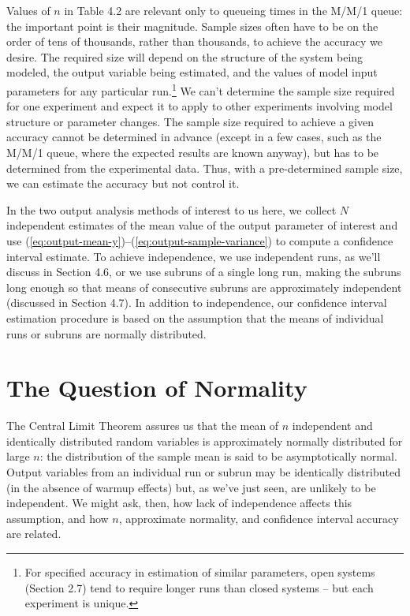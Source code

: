 Values of $n$ in Table 4.2 are relevant only to queueing times in the M/M/1
queue: the important point is their magnitude. Sample sizes often have to be
on the order of tens of thousands, rather than thousands, to achieve the
accuracy we desire. The required size will depend on the structure of the
system being modeled, the output variable being estimated, and the values of
model input parameters for any particular run.\footnote{For specified accuracy
in estimation of similar parameters, open systems (Section 2.7) tend to
require longer runs than closed systems -- but each experiment is unique.} We
can't determine the sample size required for one experiment and expect it to
apply to other experiments involving model structure or parameter changes.
The sample size required to achieve a given accuracy cannot be determined in
advance (except in a few cases, such as the M/M/1 queue, where the expected
results are known anyway), but has to be determined from the experimental
data. Thus, with a pre-determined sample size, we can estimate the accuracy
but not control it.

In the two output analysis methods of interest to us here, we collect $N$
independent estimates of the mean value of the output parameter of interest
and use (\ref{eq:output-mean-y})--(\ref{eq:output-sample-variance}) to compute
a confidence interval estimate. To achieve independence, we use independent
runs, as we'll discuss in Section 4.6, or we use subruns of a single long run,
making the subruns long enough so that means of consecutive subruns are
approximately independent (discussed in Section 4.7). In addition to
independence, our confidence interval estimation procedure is based on the
assumption that the means of individual runs or subruns are normally
distributed.

\section{The Question of Normality}
\label{sec:question-of-normality}

The Central Limit Theorem assures us that the mean of $n$ independent and
identically distributed random variables is approximately normally
distributed for large $n$: the distribution of the sample mean is said to be
asymptotically normal. Output variables from an individual run or subrun may
be identically distributed (in the absence of warmup effects) but, as we've
just seen, are unlikely to be independent. We might ask, then, how lack of
independence affects this assumption, and how $n$, approximate normality, and
confidence interval accuracy are related.


